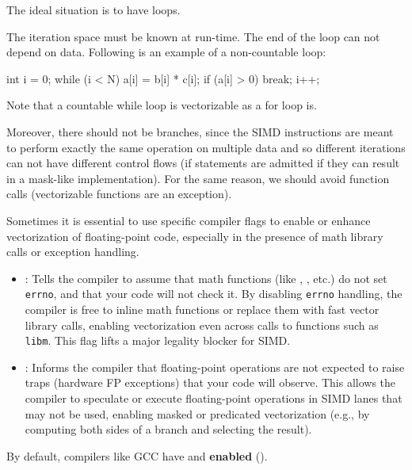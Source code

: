 The ideal situation is to have  loops.

The iteration space must be known at run-time. The end of the loop can not depend on data. Following is an example of a non-countable loop:

\begin{codeblock}[language=C]
int i = 0;
while (i < N) {
    a[i] = b[i] * c[i];
    if (a[i] > 0) {
        break;
    }
    i++;
}
\end{codeblock}

\begin{tipsblock}
    Note that a countable while loop is vectorizable as a for loop is.
\end{tipsblock}

Moreover, there should not be branches, since the SIMD instructions are meant to perform exactly the same operation on multiple data and so different iterations can not have different control flows (if statements are admitted if they can result in a mask-like implementation). For the same reason, we should avoid function calls (vectorizable functions are an exception).

Sometimes it is essential to use specific compiler flags to enable or enhance vectorization of floating-point code, especially in the presence of math library calls or exception handling.

\begin{itemize}
    \item \textbf{}: Tells the compiler to assume that math functions (like , , etc.) do not set \texttt{errno}, and that your code will not check it. By disabling \texttt{errno} handling, the compiler is free to inline math functions or replace them with fast vector library calls, enabling vectorization even across calls to functions such as \texttt{libm}. This flag lifts a major legality blocker for SIMD.
    \item \textbf{}: Informs the compiler that floating-point operations are not expected to raise traps (hardware FP exceptions) that your code will observe. This allows the compiler to speculate or execute floating-point operations in SIMD lanes that may not be used, enabling masked or predicated vectorization (e.g., by computing both sides of a branch and selecting the result).
\end{itemize}

By default, compilers like GCC have  and  \textbf{enabled} ().

